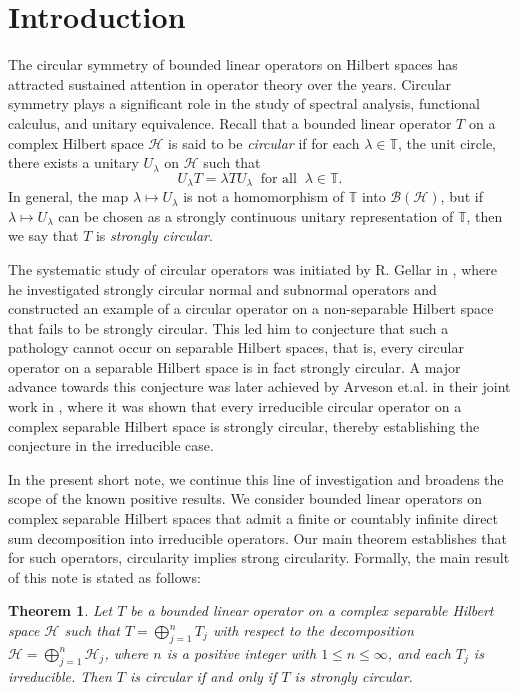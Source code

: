 \documentclass[a4paper,oneside,10pt, reqno]{amsproc}
\newtheorem{theorem}{Theorem}[section]
\theoremstyle{remark}
\theoremstyle{definition}
\begin{document}
\maketitle

\section{Introduction}

The circular symmetry of bounded linear operators on Hilbert spaces has attracted sustained attention in operator theory over the years. Circular symmetry plays a significant role in the study of spectral analysis, functional calculus, and unitary equivalence. Recall that a bounded linear operator $T$ on a complex Hilbert space $\mathcal H$ is said to be {\it circular} if for each $\lambda \in \mathbb T$, the unit circle, there exists a unitary $U_\lambda$ on $\mathcal H$ such that
\[
U_\lambda T = \lambda T U_\lambda\ \text{ for all }\ \lambda \in \mathbb T.
\]
In general, the map $\lambda \mapsto U_\lambda$ is not a homomorphism of $\mathbb T$ into $\mathcal B(\mathcal H)$, but if $\lambda \mapsto U_\lambda$ can be chosen as a strongly continuous unitary representation of $\mathbb T$, then we say that $T$ is {\it strongly circular}. 

The systematic study of circular operators was initiated by R. Gellar in \cite{G}, where he investigated strongly circular normal and subnormal operators and constructed an example of a circular operator on a non-separable Hilbert space that fails to be strongly circular. This led him to conjecture that such a pathology cannot occur on separable Hilbert spaces, that is, every circular operator on a separable Hilbert space is in fact strongly circular. A major advance towards this conjecture was later achieved by Arveson et.al. in their joint work in \cite{AHHK}, where it was shown that every irreducible circular operator on a complex separable Hilbert space is strongly circular, thereby establishing the conjecture in the irreducible case.

In the present short note, we continue this line of investigation and broadens the scope of the known positive results. We consider bounded linear operators on complex separable Hilbert spaces that admit a finite or countably infinite direct sum decomposition into irreducible operators. Our main theorem establishes that for such operators, circularity implies strong circularity. Formally, the main result of this note is stated as follows:

\begin{theorem}\label{main-thm}
Let $T$ be a bounded linear operator on a complex separable Hilbert space $\mathcal H$ such that $T = \bigoplus_{j=1}^n T_j$ with respect to the decomposition $\mathcal H = \bigoplus_{j=1}^n \mathcal H_j$, where $n$ is a positive integer with $1 \leqslant n \leqslant \infty$, and each $T_j$ is irreducible. Then $T$ is circular if and only if $T$ is strongly circular.
\end{theorem}
\end{document}
